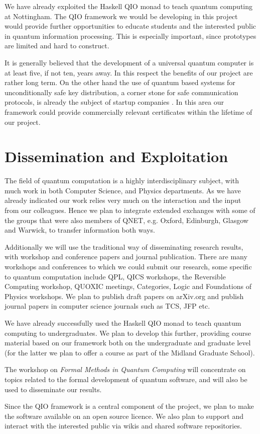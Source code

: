 \documentclass[a4paper]{article}
\begin{document}
We have already exploited the Haskell QIO monad to teach quantum
computing at Nottingham. The QIO framework we would be developing in
this project would provide further opportunities to educate students
and the interested public in quantum information processing. This is
especially important, since prototypes are limited and hard to
construct. 

It is generally believed that the development of a universal quantum
computer is at least five, if not ten, years away. In this respect the
benefits of our project are rather long term. On the other hand the
use of quantum based systems for unconditionally safe key
distribution, a corner stone for safe communication protocols, is
already the subject of startup companies . 
In this area our framework could provide commercially
relevant certificates within the lifetime of our project.

\section{Dissemination and Exploitation}

The field of quantum computation is a highly interdisciplinary
subject, with much work in both Computer Science, and Physics
departments. As we have already indicated our work relies very much on
the interaction and the input from our colleagues. Hence we plan to
integrate extended exchanges with  some of the groups that were also
members of QNET, e.g. Oxford, Edinburgh, Glasgow and Warwick, to
transfer information both ways. 

Additionally we will use the traditional way of disseminating
research results, with workshop and conference papers and journal
publication. There are many workshops and conferences to which we
could submit our research, some specific to quantum computation
include QPL, QICS workshops, the Reversible
Computing workshop, QUOXIC meetings, Categories, Logic and Foundations
of Physics workshops. We plan to publish draft papers on arXiv.org
and publish journal papers in computer science journals such as
TCS, JFP etc. 

We have already successfully used the Haskell QIO monad to teach
quantum computing to undergraduates. We plan to develop this further,
providing course material based on our framework both on the
undergraduate and graduate level (for the latter we plan to offer a
course as part of the Midland Graduate School).

The workshop on \emph{Formal Methods in Quantum Computing} will 
concentrate on topics related to the formal development of quantum
software, and will also be used to disseminate our results. 

Since the QIO framework is a central component of the project, we plan
to make the software available on an open source licence.  We also
plan to support and interact with the interested public via wikis and
shared software repositories.

{\footnotesize
{}
}
\end{document}
